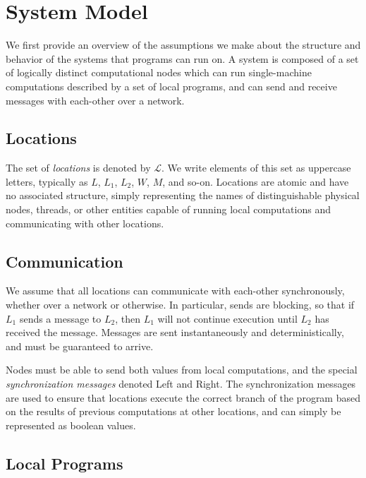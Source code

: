 \section{System Model}
\label{sec:system_model}

We first provide an overview of the assumptions we make about the structure and behavior of the systems that \langname{} programs can run on.
A system is composed of a set of logically distinct computational nodes which can run single-machine computations described by a set of local programs, and can send and receive messages with each-other over a network.

\subsection{Locations}
\label{sec:locations}

The set of \emph{locations} is denoted by $\mathcal{L}$.
We write elements of this set as uppercase letters, typically as $L$, $L_1$, $L_2$, $W$, $M$, and so-on.
Locations are atomic and have no associated structure, simply representing the names of distinguishable physical nodes, threads, or other entities capable of running local computations and communicating with other locations.

\subsection{Communication}
\label{sec:communication}

We assume that all locations can communicate with each-other synchronously, whether over a network or otherwise.
In particular, sends are blocking, so that if $L_1$ sends a message to $L_2$, then $L_1$ will not continue execution until $L_2$ has received the message.
Messages are sent instantaneously and deterministically, and must be guaranteed to arrive.

Nodes must be able to send both values from local computations, and the special \emph{synchronization messages} denoted \textsf{Left} and \textsf{Right}.
The synchronization messages are used to ensure that locations execute the correct branch of the program based on the results of previous computations at other locations, and can simply be represented as boolean values.


\subsection{Local Programs}
\label{sec:local-programs}

